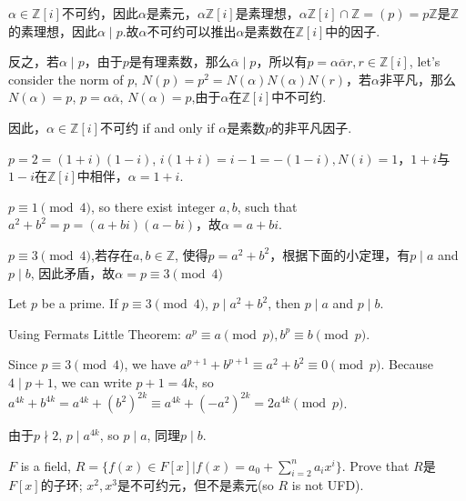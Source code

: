 \documentclass{report}
\begin{document}

\sol
{

$\alpha \in \mathbb{Z}[i]$不可约，因此$\alpha$是素元，$\alpha \mathbb{Z}[i]$是素理想，$\alpha \mathbb{Z}[i]\cap \mathbb{Z}=(p)=p\mathbb{Z}$是$\mathbb{Z}$的素理想，因此$\alpha\mid p$.故$\alpha$不可约可以推出$\alpha$是素数在$\mathbb{Z}[i]$中的因子.

反之，若$\alpha \mid p$，由于$p$是有理素数，那么$\overline{\alpha} \mid p$，所以有$p=\alpha\overline{\alpha}r, r\in \mathbb{Z}[i]$, let's consider the norm of $p$, $N(p)=p^2=N(\alpha)N(\alpha)N(r)$，若$\alpha$非平凡，那么$N(\alpha)=p$, $p=\alpha\overline{\alpha}$, $N(\alpha)=p$,由于$\alpha$在$\mathbb{Z}[i]$中不可约.

因此，$\alpha \in \mathbb{Z}[i]$不可约 if and only if $\alpha$是素数$p$的非平凡因子.

$p=2=(1+i)(1-i)$, $i(1+i)=i-1=-(1-i), N(i)=1$，$1+i$与$1-i$在$\mathbb{Z}[i]$中相伴，$\alpha=1+i$.

$p \equiv 1 \pmod 4$, so there exist integer $a,b$, such that $a^2+b^2=p=(a+bi)(a-bi)$，故$\alpha=a+bi$.

$p \equiv 3 \pmod 4$,若存在$a,b \in \mathbb{Z}$, 使得$p=a^2+b^2$，根据下面的小定理，有$p \mid a$ and $p\mid b$, 因此矛盾，故$\alpha=p \equiv 3 \pmod 4$

\thm{}
{
    Let $p$ be a prime. If $p \equiv 3 \pmod 4$, $p \mid a^2+b^2$, then $p\mid a$ and $p\mid b$.
    
}

\begin{myproof}

    Using Fermats Little Theorem: $a^p \equiv a \pmod p, b^p \equiv b \pmod p$.

    Since $p \equiv 3 \pmod 4$, we have $a^{p+1} + b^{p+1} \equiv a^2+b^2 \equiv 0 \pmod p$. Because $4 \mid p+1$, we can write $p+1=4k$, so $a^{4k}+b^{4k} = a^{4k}+(b^2)^{2k} \equiv a^{4k}+(-a^2)^{2k}=2a^{4k} \pmod p$.
    
    由于$p \nmid 2$, $p \mid a^{4k}$, so $p \mid a$, 同理$p \mid b$.


\end{myproof}

}

{
    $F$ is a field, $R=\{f(x) \in F[x]| f(x)=a_0+\sum_{i=2}^n a_ix^i\}$. Prove that $R$是$F[x]$的子环; $x^2, x^3$是不可约元，但不是素元(so $R$ is not UFD).
}
\end{document}
